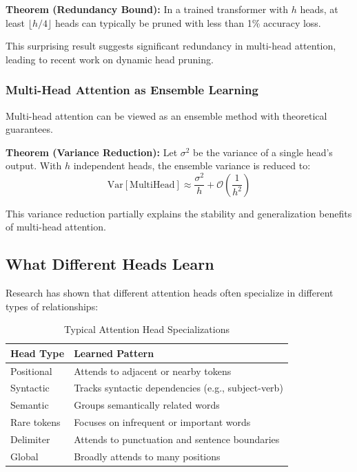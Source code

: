 \textbf{Theorem (Redundancy Bound):} In a trained transformer with $h$ heads, at least $\lfloor h/4 \rfloor$ heads can typically be pruned with less than 1\% accuracy loss.

This surprising result suggests significant redundancy in multi-head attention, leading to recent work on dynamic head pruning.

\subsubsection{Multi-Head Attention as Ensemble Learning}

Multi-head attention can be viewed as an ensemble method with theoretical guarantees.

\textbf{Theorem (Variance Reduction):} Let $\sigma^2$ be the variance of a single head's output. With $h$ independent heads, the ensemble variance is reduced to:
\begin{equation}
\text{Var}[\text{MultiHead}] \approx \frac{\sigma^2}{h} + \mathcal{O}\left(\frac{1}{h^2}\right)
\end{equation}

This variance reduction partially explains the stability and generalization benefits of multi-head attention.

\subsection{What Different Heads Learn}

Research has shown that different attention heads often specialize in different types of relationships:

\begin{table}[H]
\centering
\caption{Typical Attention Head Specializations}
\begin{tabular}{l l}
\toprule
\textbf{Head Type} & \textbf{Learned Pattern} \\
\midrule
Positional & Attends to adjacent or nearby tokens \\
Syntactic & Tracks syntactic dependencies (e.g., subject-verb) \\
Semantic & Groups semantically related words \\
Rare tokens & Focuses on infrequent or important words \\
Delimiter & Attends to punctuation and sentence boundaries \\
Global & Broadly attends to many positions \\
\bottomrule
\end{tabular}
\end{table}
